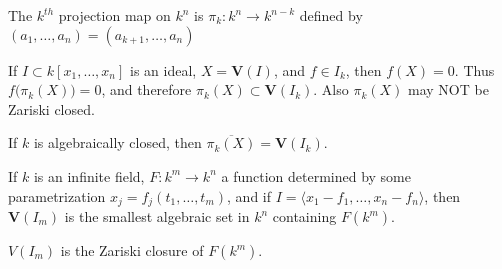 \documentclass[crop=false,class=article,oneside]{standalone}
\begin{document}
    \begin{definition}
    The $k^{th}$ projection map on $k^n$ is $\pi_{k}: k^n\rightarrow k^{n-k}$ defined by $(a_1,\hdots, a_n) = (a_{k+1},\hdots, a_n)$
    \end{definition}
    \begin{remark}
    If $I\subset k[x_1,\hdots ,x_n]$ is an ideal, $X = \mathbf{V}(I)$, and $f\in I_k$, then $f(X) = 0$. Thus $f\big(\pi_{k}(X)\big)=0$, and therefore $\pi_{k}(X) \subset \mathbf{V}(I_k)$. Also $\pi_{k}(X)$ may NOT be Zariski closed.
    \end{remark}
    \begin{theorem}
    If $k$ is algebraically closed, then $\overline{\pi_k(X)}=\mathbf{V}(I_k)$.
    \end{theorem}
    \begin{theorem}
    If $k$ is an infinite field, $F:k^m \rightarrow k^n$ a function determined by some parametrization $x_j = f_j(t_1,\hdots, t_m)$, and if $I = \langle x_1-f_1,\hdots, x_n-f_n\rangle$, then $\mathbf{V}(I_m)$ is the smallest algebraic set in $k^n$ containing $F(k^m)$.
    \end{theorem}
    \begin{remark}
    $V(I_m)$ is the Zariski closure of $F(k^m)$.
    \end{remark}
\end{document}
